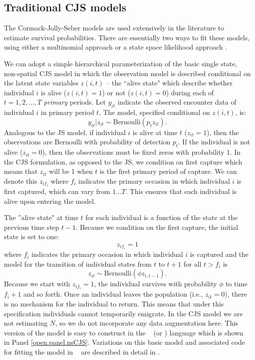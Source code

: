 \subsection{Traditional CJS models}

The Cormack-Jolly-Seber models are used extensively in the literature
to estimate survival probabilities.  There are essentially two ways to
fit these models, using either a
multinomial approach \citep{lebreton_etal:1992} or a state space
likelihood approach \citep{gimenez:2007, royle:2008}.

We can adopt a simple hierarchical parameterization of the
basic single state, non-spatial CJS model in which the observation model is
described conditional on the latent state variables $z(i,t)$ -- the
``alive state" which describe whether individual $i$ is
alive ($z(i,t)=1$) or not ($z(i,t)=0$) during each of $t=1,2,\ldots,T$
{\it primary} periods.
Let $y_{it}$ indicate the observed
encounter data of individual $i$ in primary period $t$. The
model, specified conditional on $z(i,t)$, is:
 \[
  y_{it}|z_{it} \sim
\mbox{Bernoulli}(p_{t}z_{it}).
\]
Analogous to the JS model, if individual $i$ is alive at time $t$ ($z_{it}=1$),
then the observations are Bernoulli with probability of detection $p_t$.
If the
individual is not alive ($z_{it}=0$), then the observations must be
fixed zeros with probability 1.
In the CJS formulation, as opposed to the JS, we condition on first capture which means that $z_{it}$ will
be 1 when $t$ is the first primary period of capture.   We can denote this $z_{i f_i}$
where $f_i$ indicates the primary occasion in which individual $i$ is first captured, which
can vary from $1 \dots T$.
This ensures that each individual is alive upon entering the model.

The ''alive state" at time $t$ for each individual is a
function of the state at the previous time step $t-1$.   Because
we condition on the first capture, the initial
state is set to one:
\[
 z_{i f_i} = 1
\]
where $f_i$ indicates the primary occasion in which individual $i$ is 
captured and the model for the transition of individual states from $t$ to $t+1$ for
all $t > f_i$ is
\[
 z_{i t} \sim \mbox{Bernoulli}( \phi z_{i,t-1}).
\]
Because we start with $z_{i f_i} = 1$, the individual survives with probability
$\phi$ to time $f_i + 1$ and so forth.  Once an individual leaves the
population (i.e., $z_{it} = 0$), there is no mechanism for the
individual to return.
This means that under this specification individuals cannot
temporarily emigrate.  In the CJS model we are not estimating $N$, so we do not incorporate
any data augmentation here.  This version of the model is easy to construct in the \bugs~ (or \jags)
language which is shown in Panel \ref{open.panel.nsCJS}.  Variations on this basic model and associated code for
fitting the model in \bugs~ are described in detail in \citet[][Chapts. 7-9]{kery_schaub:2011}.

